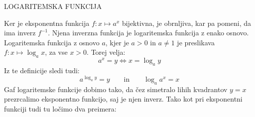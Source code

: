 \begin{center}
LOGARITEMSKA FUNKCIJA
\end{center}

Ker je eksponentna funkcija  $f: x \mapsto a^x$ bijektivna, je obrnljiva, kar pa pomeni, da ima inverz $f^{-1}$. Njena inverzna funkcija je logaritemska funkcija z enako osnovo. Logaritemska funkcija z osnovo $a$, kjer je $a > 0$ in $a \neq 1$ je preslikava $f: x \mapsto \log_a{x}$, za vse $x > 0$. Torej velja:
\begin{equation*}
a^x=y \Leftrightarrow x=\log_a{y}
\end{equation*}
%
Iz te definicije sledi tudi: 
\begin{equation*}
a^{\log_a{y}} = y \qquad \text{in} \qquad \log_a{a^x} = x
\end{equation*}
%
Gaf logaritemske funkcije dobimo tako, da čez simetralo lihih kvadrantov $y=x$ prezrcalimo eksponentno funkcijo, saj je njen inverz. Tako kot pri eksponentni funkciji tudi tu ločimo dva preimera:
